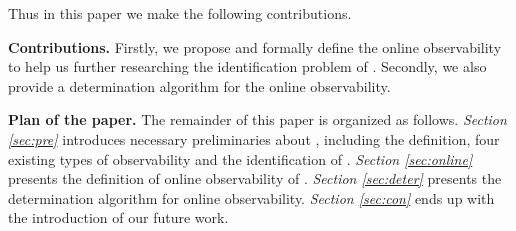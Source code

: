 Thus in this paper we make the following contributions.

\medskip\noindent
{\bf Contributions.}
Firstly, we propose and formally define the online observability to help us further researching the identification problem of \BCNs. %
Secondly, we also provide a determination algorithm for the online observability. %

\medskip\noindent
{\bf Plan of the paper.}
The remainder of this paper is organized as follows.
 {\em Section \ref{sec:pre}} introduces necessary preliminaries about \BCNs, including the definition, four existing types of observability and the identification of \BCNs. {\em Section \ref{sec:online}} presents the definition of online observability of \BCNs. {\em Section \ref{sec:deter}} presents the determination algorithm for online observability. 
 {\em Section \ref{sec:con}} ends up with the introduction of our future work.

